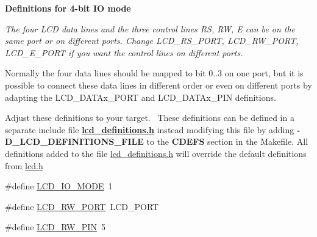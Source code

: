 \begin{Indent}{\bf Definitions for 4-\/bit IO mode}\par
{\em The four L\+CD data lines and the three control lines RS, RW, E can be on the same port or on different ports. Change L\+C\+D\+\_\+\+R\+S\+\_\+\+P\+O\+RT, L\+C\+D\+\_\+\+R\+W\+\_\+\+P\+O\+RT, L\+C\+D\+\_\+\+E\+\_\+\+P\+O\+RT if you want the control lines on different ports.

Normally the four data lines should be mapped to bit 0..3 on one port, but it is possible to connect these data lines in different order or even on different ports by adapting the L\+C\+D\+\_\+\+D\+A\+T\+Ax\+\_\+\+P\+O\+RT and L\+C\+D\+\_\+\+D\+A\+T\+Ax\+\_\+\+P\+IN definitions.

Adjust these definitions to your target.~\newline
These definitions can be defined in a separate include file {\bfseries \hyperlink{a00003}{lcd\+\_\+definitions.\+h}} instead modifying this file by adding {\bfseries -\/\+D\+\_\+\+L\+C\+D\+\_\+\+D\+E\+F\+I\+N\+I\+T\+I\+O\+N\+S\+\_\+\+F\+I\+LE} to the {\bfseries C\+D\+E\+FS} section in the Makefile. All definitions added to the file \hyperlink{a00003}{lcd\+\_\+definitions.\+h} will override the default definitions from \hyperlink{a00002}{lcd.\+h} }\begin{DoxyCompactItemize}
\item 
\#define \hyperlink{a00006_ga659fcdf979f69bbd14f852f525f25e02}{L\+C\+D\+\_\+\+I\+O\+\_\+\+M\+O\+DE}~1
\item 
\#define \hyperlink{a00006_gae8772bdf31db863b81805c837bdc2da2}{L\+C\+D\+\_\+\+R\+W\+\_\+\+P\+O\+RT}~L\+C\+D\+\_\+\+P\+O\+RT
\item 
\#define \hyperlink{a00006_ga3ac938dd5fc02a9a232df6605b5f6aa8}{L\+C\+D\+\_\+\+R\+W\+\_\+\+P\+IN}~5
\end{DoxyCompactItemize}
\end{Indent}
